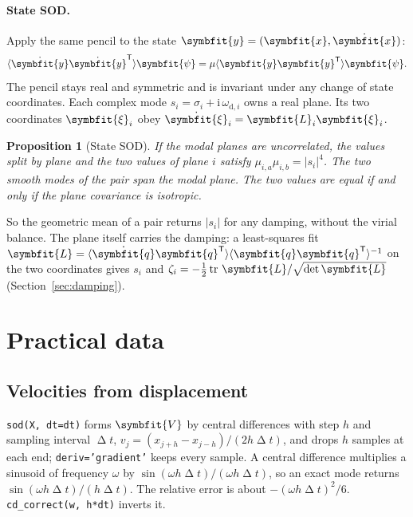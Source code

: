 \documentclass[report]{nld}
\newtheorem{proposition}{Proposition}
\newcommand{\V}{{\symbfit{V}}}
\newcommand{\Lm}{{\symbfit{L}}}
\newcommand{\x}{{\symbfit{x}}}
\newcommand{\y}{{\symbfit{y}}}
\newcommand{\q}{{\symbfit{q}}}
\newcommand{\psib}{{\symbfit{\psi}}}
\newcommand{\avg}[1]{\langle #1\rangle}
\newcommand{\code}[1]{\texttt{#1}}
\begin{document}
\paragraph{State SOD.} Apply the same pencil to the state $\y=(\x,\dot\x)$:
\begin{equation}
  \avg{\dot\y\dot\y^{\mathsf T}}\psib=\mu\avg{\y\y^{\mathsf T}}\psib .
\end{equation}
The pencil stays real and symmetric and is invariant under any change of state
coordinates. Each complex mode $s_i=\sigma_i+\mathrm{i}\,\omega_{\mathrm d,i}$ owns a real
plane. Its two coordinates ${\symbfit{\xi}}_i$ obey $\dot{{\symbfit{\xi}}}_i=\Lm_i{\symbfit{\xi}}_i$.

\begin{proposition}[State SOD]\label{prop:ssod}
If the modal planes are uncorrelated, the values split by plane and the two values
of plane $i$ satisfy $\mu_{i,a}\mu_{i,b}=|s_i|^4$. The two smooth modes of the pair
span the modal plane. The two values are equal if and only if the plane covariance
is isotropic.
\end{proposition}

So the geometric mean of a pair returns $|s_i|$ for any damping, without the
virial balance. The plane itself carries the damping: a least-squares fit
$\Lm=\avg{\dot\q\q^{\mathsf T}}\avg{\q\q^{\mathsf T}}^{-1}$ on the two coordinates gives
$s_i$ and $\zeta_i=-\tfrac12\operatorname{tr}\,\Lm/\sqrt{\det\Lm}$ (Section~\ref{sec:damping}).

\section{Practical data}\label{sec:practical}

\subsection{Velocities from displacement}\label{sec:fd}

\code{sod(X, dt=dt)} forms $\V$ by central differences with step $h$ and sampling interval $\upDelta t$,
$v_j=(x_{j+h}-x_{j-h})/(2h\upDelta t)$, and drops $h$ samples at each end;
\code{deriv='gradient'} keeps every sample. A central difference multiplies a
sinusoid of frequency $\omega$ by $\sin(\omega h\upDelta t)/(\omega h\upDelta t)$, so an
exact mode returns $\sin(\omega h\upDelta t)/(h\upDelta t)$. The relative error is about
$-(\omega h\upDelta t)^2/6$. \code{cd\_correct(w, h*dt)} inverts it.
\end{document}
